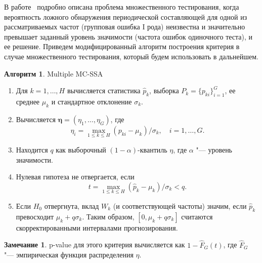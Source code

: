 \documentclass[specialist,
substylefile = spbu_report.rtx,
subf,href,colorlinks=true, 12pt]{disser}
\theoremstyle{definition}
\newtheorem{algorithm}{Алгоритм}
\newtheorem{remark}{Замечание}
\begin{document}
В работе~\cite{Golyandina_2023} подробно описана проблема множественного тестирования, когда вероятность ложного обнаружения периодической составляющей для одной из рассматриваемых частот (групповая ошибка I рода) неизвестна и значительно превышает заданный уровень значимости (частота ошибок одиночного теста), и ее решение. Приведем модифицированный алгоритм построения критерия в случае множественного тестирования, который будем использовать в дальнейшем.
\begin{algorithm}{Multiple MC-SSA~\cite{Golyandina_2023}}\label{alg:multiple_mc-ssa}
	\begin{enumerate}
		\item Для $k=1,\dots,H$ вычисляется статистика $\widehat{p}_k$, выборка $P_k=\{p_{ki}\}_{i=1}^G$, ее среднее $\mu_k$ и стандартное отклонение $\sigma_k$.
		\item Вычисляется $\mathbf{\eta}=(\eta_1,\dots,\eta_G)$, где
		      \[
			      \eta_i=\max_{1\leqslant k\leqslant H}(p_{ki}-\mu_k)/\sigma_k,\quad i=1,\dots,G.
		      \]
		\item Находится $q$ как выборочный $(1-\alpha)$-квантиль $\eta$, где $\alpha$ "--- уровень значимости.
		\item Нулевая гипотеза не отвергается, если
		      \[
			      t = \max_{1\leqslant k\leqslant H}(\widehat{p}_k-\mu_k)/\sigma_k<q.
		      \]
		\item Если $H_0$ отвергнута, вклад $W_k$ (и соответствующей частоты) значим, если $\widehat{p}_k$ превосходит $\mu_k+q\sigma_k$. Таким образом, $[0,\mu_k+q\sigma_k]$ считаются скорректированными интервалами прогнозирования.
	\end{enumerate}
\end{algorithm}

\begin{remark}
	p-value для этого критерия вычисляется как $1-\hat F_G(t)$, где $\hat F_G$ "--- эмпирическая функция распределения $\eta$.
\end{remark}



\end{document}
